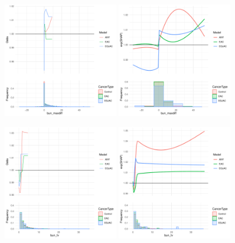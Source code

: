 \documentclass[12pt]{article}
\begin{document}
\begin{figure}[h]
\centering
\includegraphics[width=0.45\textwidth]{pdp/bun_maxdiff.pdf}
\includegraphics[width=0.45\textwidth]{shap/bun_maxdiff.pdf}
\end{figure}
\begin{figure}[h]
\centering
\includegraphics[width=0.45\textwidth]{pdp/bun_tv.pdf}
\includegraphics[width=0.45\textwidth]{shap/bun_tv.pdf}
\end{figure}
\end{document}
